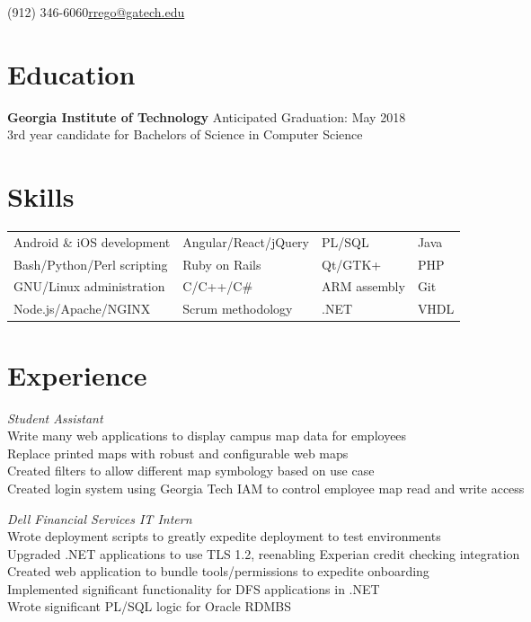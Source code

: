 \documentclass[line, margin]{resume}
\begin{document}
\begin{center}
 {(912) 346-6060}{\href{mailto:rrego@gatech.edu}{rrego@gatech.edu}}
\end{center}
\section{Education}
\textbf{Georgia Institute of Technology} \hfill Anticipated Graduation: May 2018  \\
3rd year candidate for Bachelors of Science in Computer Science
\section{Skills}
\begin{tabular}{l l l l} Android \& iOS development & Angular/React/jQuery & PL/SQL & Java \\
	Bash/Python/Perl scripting & Ruby on Rails & Qt/GTK+ & PHP \\
	GNU/Linux administration & C/C++/C\# & ARM assembly & Git \\
	Node.js/Apache/NGINX & Scrum methodology & .NET & VHDL
\end{tabular}
\section{Experience}
\textit{Student Assistant} \\
Write many web applications to display campus map data for employees\\
Replace printed maps with robust and configurable web maps\\
Created filters to allow different map symbology based on use case\\
Created login system using Georgia Tech IAM to control employee map read and write access 

\textit{Dell Financial Services IT Intern} \\
Wrote deployment scripts to greatly expedite deployment to test environments \\
Upgraded .NET applications to use TLS 1.2, reenabling Experian credit checking integration \\
Created web application to bundle tools/permissions to expedite onboarding \\
Implemented significant functionality for DFS applications in .NET \\
Wrote significant PL/SQL logic for Oracle RDMBS
\end{document}
